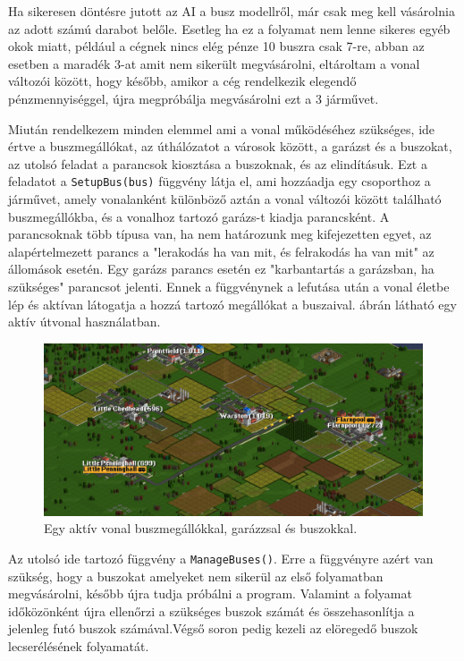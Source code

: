 Ha sikeresen döntésre jutott az AI a busz modellről, már csak meg kell vásárolnia az adott számú darabot belőle. Esetleg ha ez a folyamat nem lenne sikeres egyéb okok miatt, például a cégnek nincs elég pénze 10 buszra csak 7-re, abban az esetben a maradék 3-at amit nem sikerült megvásárolni, eltároltam a vonal változói között, hogy később, amikor a cég rendelkezik elegendő pénzmennyiséggel, újra megpróbálja megvásárolni ezt a 3 járművet.

Miután rendelkezem minden elemmel ami a vonal működéséhez szükséges, ide értve a buszmegállókat, az úthálózatot a városok között, a garázst és a buszokat, az utolsó feladat a parancsok kiosztása a buszoknak, és az elindításuk. Ezt a feladatot a \texttt{SetupBus(bus)} függvény látja el, ami hozzáadja egy csoporthoz a járművet, amely vonalanként különböző aztán a vonal változói között található buszmegállókba, és a vonalhoz tartozó garázs-t kiadja parancsként. A parancsoknak több típusa van, ha nem határozunk meg kifejezetten egyet, az alapértelmezett parancs a "lerakodás ha van mit, és felrakodás ha van mit" az állomások esetén. Egy garázs parancs esetén ez "karbantartás a garázsban, ha szükséges" parancsot jelenti. Ennek a függvénynek a lefutása után a vonal életbe lép és aktívan látogatja a hozzá tartozó megállókat a buszaival.  ábrán látható egy aktív útvonal használatban.

\begin{figure}
	\centering
	\includegraphics[width=\textwidth]{images/vonal.png}
	\caption{Egy aktív vonal buszmegállókkal, garázzsal és buszokkal.}
	\label{fig:vonal}
\end{figure}

Az utolsó ide tartozó függvény a \texttt{ManageBuses()}. Erre a függvényre azért van szükség, hogy a buszokat amelyeket nem sikerül az első folyamatban megvásárolni, később újra tudja próbálni a program. Valamint a folyamat időközönként újra ellenőrzi a szükséges buszok számát és összehasonlítja a jelenleg futó buszok számával.Végső soron pedig kezeli az elöregedő buszok lecserélésének folyamatát.


